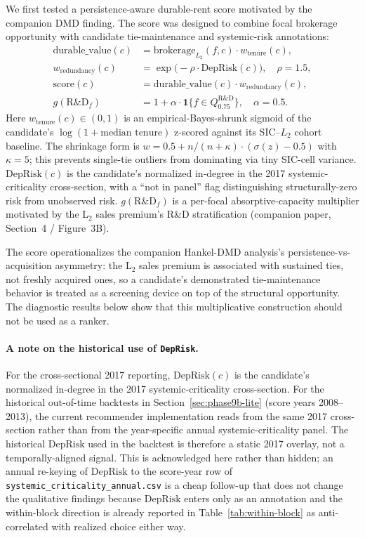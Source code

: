 \documentclass[11pt,letterpaper]{article}
\begin{document}
We first tested a persistence-aware durable-rent score motivated by
the companion DMD finding.  The score was designed to combine focal
brokerage opportunity with candidate tie-maintenance and
systemic-risk annotations:
\begin{align}
\text{durable\_value}(c)
   &= \text{brokerage}_{L_2}(f, c) \cdot w_{\text{tenure}}(c), \\
w_{\text{redundancy}}(c)
   &= \exp\!\bigl(-\rho \cdot \text{DepRisk}(c)\bigr),
\quad \rho = 1.5, \\
\text{score}(c)
   &= \text{durable\_value}(c) \cdot w_{\text{redundancy}}(c), \\
g(\text{R\&D}_{f})
   &= 1 + \alpha \cdot \mathbf{1}\{f \in Q^{\text{R\&D}}_{0.75}\},
\quad \alpha = 0.5.
\end{align}
Here $w_{\text{tenure}}(c) \in (0, 1)$ is an empirical-Bayes-shrunk
sigmoid of the candidate's $\log(1+\text{median tenure})$ z-scored
against its SIC--$L_2$ cohort baseline.  The shrinkage form is
$w = 0.5 + n / (n+\kappa) \cdot (\sigma(z) - 0.5)$ with $\kappa = 5$;
this prevents single-tie outliers from dominating via tiny SIC-cell
variance.  $\text{DepRisk}(c)$ is the candidate's normalized in-degree
in the 2017 systemic-criticality cross-section, with a ``not in
panel'' flag distinguishing structurally-zero risk from unobserved
risk.  $g(\text{R\&D}_f)$ is a per-focal absorptive-capacity
multiplier motivated by the L$_2$ sales premium's R\&D
stratification (companion paper, Section~4 / Figure~3B).

The score operationalizes the companion Hankel-DMD analysis's
persistence-vs-acquisition asymmetry: the L$_2$ sales premium is
associated with sustained ties, not freshly acquired ones, so a
candidate's demonstrated tie-maintenance behavior is treated as a
screening device on top of the structural opportunity.  The
diagnostic results below show that this multiplicative construction
should not be used as a ranker.

\paragraph{A note on the historical use of \texttt{DepRisk}.}
For the cross-sectional 2017 reporting, $\text{DepRisk}(c)$ is the
candidate's normalized in-degree in the 2017 systemic-criticality
cross-section.  For the historical out-of-time backtests in
Section~\ref{sec:phase9b-lite} (score years 2008--2013), the current
recommender implementation reads from the same 2017 cross-section
rather than from the year-specific annual systemic-criticality
panel.  The historical $\text{DepRisk}$ used in the backtest is
therefore a static 2017 overlay, not a temporally-aligned signal.
This is acknowledged here rather than hidden; an annual re-keying of
$\text{DepRisk}$ to the score-year row of \texttt{systemic\_criticality\_annual.csv}
is a cheap follow-up that does not change the qualitative findings
because $\text{DepRisk}$ enters only as an annotation and the
within-block direction is already reported in
Table~\ref{tab:within-block} as anti-correlated with realized choice
either way.
\end{document}
